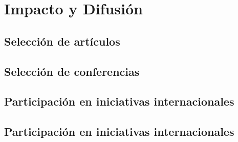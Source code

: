 \documentclass[a4paper,final,11pt,fleqn,twoside]{book}  %
\begin{document}
\chapter{Impacto y Difusión}

\section{Selección de artículos}
\section{Selección de conferencias}
\section{Participación en iniciativas internacionales}
\section{Participación en iniciativas internacionales}


\backmatter


\printindex
\printglossaries


\insertbibliography
\end{document}
